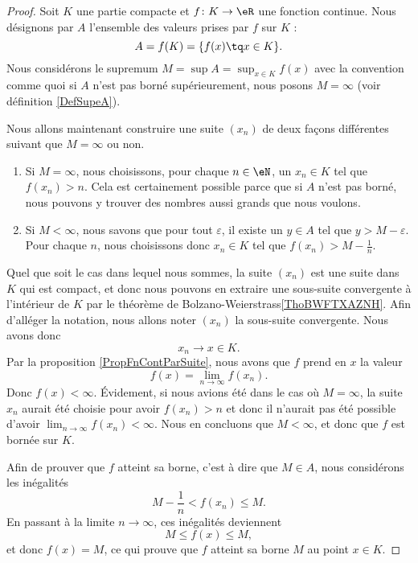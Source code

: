 \begin{proof}
	Soit $K$ une partie compacte et $f\colon K\to \eR$ une fonction continue. Nous désignons par $A$ l'ensemble des valeurs prises par $f$ sur $K$ :
	\begin{equation}
		A=f(K)=\{ f(x)\tq x\in K \}.
	\end{equation}
	Nous considérons le supremum $M=\sup A=\sup_{x\in K}f(x)$ avec la convention comme quoi si $A$ n'est pas borné supérieurement, nous posons $M=\infty$ (voir définition \ref{DefSupeA}).

	Nous allons maintenant construire une suite $(x_n)$ de deux façons différentes suivant que $M=\infty$ ou non.
	\begin{enumerate}
		\item
			Si $M=\infty$, nous choisissons, pour chaque $n\in\eN$, un $x_n\in K$ tel que $f(x_n)>n$. Cela est certainement possible parce que si $A$ n'est pas borné, nous pouvons y trouver des nombres aussi grands que nous voulons.
		\item
			Si $M<\infty$, nous savons que pour tout $\varepsilon$, il existe un $y\in A$ tel que $y>M-\varepsilon$. Pour chaque $n$, nous choisissons donc $x_n\in K$ tel que $f(x_n)>M-\frac{1}{ n }$.
	\end{enumerate}
    Quel que soit le cas dans lequel nous sommes, la suite $(x_n)$ est une suite dans $K$ qui est compact, et donc nous pouvons en extraire une sous-suite convergente à l'intérieur de \( K\) par le théorème de Bolzano-Weierstrass\ref{ThoBWFTXAZNH}. Afin d'alléger la notation, nous allons noter $(x_n)$ la sous-suite convergente. Nous avons donc 
	\begin{equation}
		x_n\to x\in K.
	\end{equation}
	Par la proposition \ref{PropFnContParSuite}, nous avons que $f$ prend en \( x\) la valeur
	\begin{equation}
		f(x)=\lim_{n\to \infty} f(x_n).
	\end{equation}
	Donc $f(x)<\infty$. Évidement, si nous avions été dans le cas où $M=\infty$, la suite $x_n$ aurait été choisie pour avoir $f(x_n)>n$ et donc il n'aurait pas été possible d'avoir $\lim_{n\to \infty} f(x_n)<\infty$. Nous en concluons que $M<\infty$, et donc que $f$ est bornée sur $K$.

	Afin de prouver que $f$ atteint sa borne, c'est à dire que $M\in A$, nous considérons les inégalités
	\begin{equation}
		M-\frac{1}{ n }<f(x_n)\leq M.
	\end{equation}
	En passant à la limite $n\to \infty$, ces inégalités deviennent
	\begin{equation}
		M\leq f(x)\leq M,
	\end{equation}
	et donc $f(x)=M$, ce qui prouve que $f$ atteint sa borne $M$ au point $x\in K$.
\end{proof}

